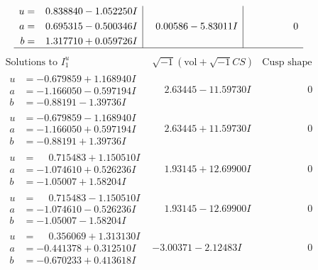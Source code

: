 \documentclass[1p]{elsarticle_modified}
\theoremstyle{definition}
\newcommand{\I}{\sqrt{-1}}
\begin{document}
$$\begin{array}{c|c|c}
\begin{aligned}
u &= \phantom{-}0.838840 - 1.052250 I \\
a &= \phantom{-}0.695315 - 0.500346 I \\
b &= \phantom{-}1.317710 + 0.059726 I\end{aligned}
 & \phantom{-}0.00586 - 5.83011 I & \phantom{-0.000000 } 0\\
 \hline 
 \end{array}$$\newpage$$\begin{array}{c|c|c}  
\text{Solutions to }I^u_{1}& \I (\text{vol} + \sqrt{-1}CS) & \text{Cusp shape}\\
 \hline 
\begin{aligned}
u &= -0.679859 + 1.168940 I \\
a &= -1.166050 - 0.597194 I \\
b &= -0.88191 - 1.39736 I\end{aligned}
 & \phantom{-}2.63445 - 11.59730 I & \phantom{-0.000000 } 0 \\ \hline\begin{aligned}
u &= -0.679859 - 1.168940 I \\
a &= -1.166050 + 0.597194 I \\
b &= -0.88191 + 1.39736 I\end{aligned}
 & \phantom{-}2.63445 + 11.59730 I & \phantom{-0.000000 } 0 \\ \hline\begin{aligned}
u &= \phantom{-}0.715483 + 1.150510 I \\
a &= -1.074610 + 0.526236 I \\
b &= -1.05007 + 1.58204 I\end{aligned}
 & \phantom{-}1.93145 + 12.69900 I & \phantom{-0.000000 } 0 \\ \hline\begin{aligned}
u &= \phantom{-}0.715483 - 1.150510 I \\
a &= -1.074610 - 0.526236 I \\
b &= -1.05007 - 1.58204 I\end{aligned}
 & \phantom{-}1.93145 - 12.69900 I & \phantom{-0.000000 } 0 \\ \hline\begin{aligned}
u &= \phantom{-}0.356069 + 1.313130 I \\
a &= -0.441378 + 0.312510 I \\
b &= -0.670233 + 0.413618 I\end{aligned}
 & -3.00371 - 2.12483 I & \phantom{-0.000000 } 0 \\ \hline\begin{aligned}

\end{aligned}
\end{array}$$
\end{document}
